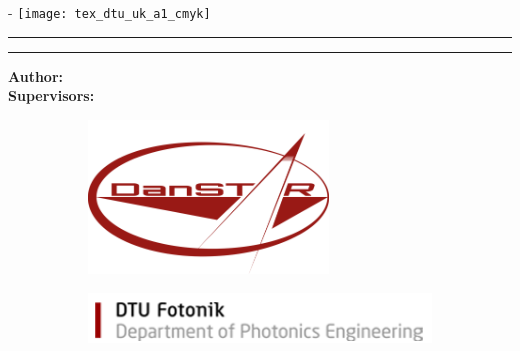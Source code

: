    
\begin{titlingpage}
	\thispagestyle{empty}
	\enlargethispage{3cm}
	\calccentering{\unitlength}
	\begin{adjustwidth}{\unitlength}{-\unitlength}
		\vspace*{-1.9cm}
		\hspace{7cm}
		{\noindent \texttt{[image: tex\_dtu\_uk\_a1\_cmyk]}}
		
		\begin{raggedright}
             \hrule
             \vspace{0.6cm}
             \centering
             \textsc{\huge \ttitle}
             \vspace{0.7cm}
             \hrule
             \vspace{1cm}
             \hspace{-7cm}
             \noindent\textbf{Author:}
			{\Large\authorname}\\
			\vspace{0.5cm}
			\hspace{-2cm}
			\noindent\textbf{Supervisors:}
		    {\Large\supname}
			
		\end{raggedright}
		\begin{raggedright}
			\begin{figure}[H]
			    \hspace{-2,5cm}
                \begin{subfigure}[H]{0.5\textwidth}
                    \includegraphics[width=0.7\textwidth]{figures/DanSTAR}
                \end{subfigure}
                \hspace{2.5cm}
                \begin{subfigure}[H]{0.5\textwidth}
                    \includegraphics[width=1.2\textwidth]{figures/DTU_Fotonik-UK}
                \end{subfigure}
            \end{figure}
		\end{raggedright}
	\end{adjustwidth}


\end{titlingpage}
